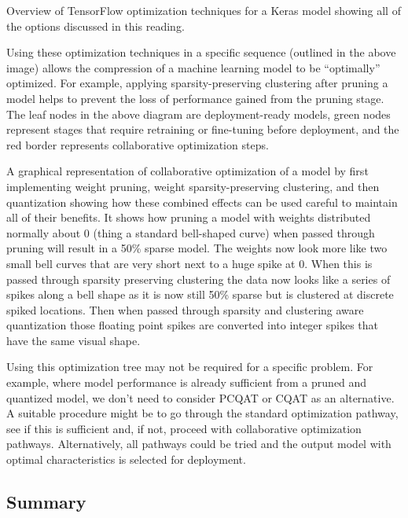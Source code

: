 {{{{{     
    Overview of TensorFlow optimization techniques for a Keras model showing all of the options discussed in this reading.
    
    Using these optimization techniques in a specific sequence (outlined in the above image) allows the compression of a machine learning model to be “optimally” optimized. For example, applying sparsity-preserving clustering after pruning a model helps to prevent the loss of performance gained from the pruning stage. The leaf nodes in the above diagram are deployment-ready models, green nodes represent stages that require retraining or fine-tuning before deployment, and the red border represents collaborative optimization steps.
    
        
    A graphical representation of collaborative optimization of a model by first implementing weight pruning, weight sparsity-preserving clustering, and then quantization showing how these combined effects can be used careful to maintain all of their benefits. It shows how pruning a model with weights distributed normally about 0 (thing a standard bell-shaped curve) when passed through pruning will result in a 50\% sparse model. The weights now look more like two small bell curves that are very short next to a huge spike at 0. When this is passed through sparsity preserving clustering the data now looks like a series of spikes along a bell shape as it is now still 50\% sparse but is clustered at discrete spiked locations. Then when passed through sparsity and clustering aware quantization those floating point spikes are converted into integer spikes that have the same visual shape.
    
    Using this optimization tree may not be required for a specific problem. For example, where model performance is already sufficient from a pruned and quantized model, we don’t need to consider PCQAT or CQAT as an alternative. A suitable procedure might be to go through the standard optimization pathway, see if this is sufficient and, if not, proceed with collaborative optimization pathways. Alternatively, all pathways could be tried and the output model with optimal characteristics is selected for deployment.
    
    \subsection{Summary}
    
}}}}}
